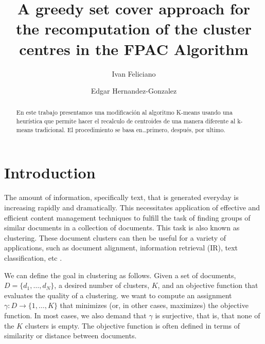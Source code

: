 \documentclass[runningheads]{llncs}
\begin{document}
%
\title{A greedy set cover approach for the recomputation of the cluster centres in the FPAC Algorithm}

\author{Ivan Feliciano \and
Edgar Hernandez-Gonzalez}
%
%
\maketitle              %
\begin{abstract}
En este trabajo presentamos una modificación al algoritmo K-means usando una heurística que permite hacer el recalculo de centroides de una manera diferente al k-means tradicional. El procedimiento se basa en…primero, después, por ultimo.

\end{abstract}
%
%
%
\section{Introduction}


The amount of information, specifically text, that is generated everyday
is increasing rapidly and dramatically. This necessitates application of effective and efficient content management techniques to fulfill the task of finding groups of similar documents in a collection of documents. This task is also known as 
clustering. These document clusters can then be useful for a variety
of applications, such as document alignment, information retrieval
(IR), text classification, etc \cite{ganguly_2018}.

We can define the goal in clustering as follows. 
Given a set of documents, $D = \{d_1 , \dots , d_N \}$,
a desired number of clusters, $K$,  and 
an objective function that evaluates the quality of a clustering.
we want to compute an assignment $\gamma : D \rightarrow \{1, \dots , K \}$ that minimizes (or, in other cases,
maximizes) the objective function. In most cases, we also demand that $\gamma$ is
surjective, that is, that none of the $K$ clusters is empty.
The objective function is often defined in terms of similarity or distance between documents.
\end{document}
